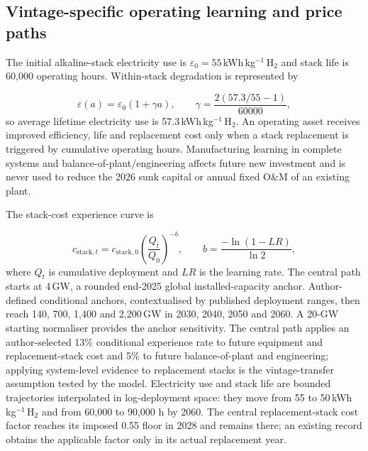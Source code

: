 \documentclass[lineno,pdflatex,sn-nature]{sn-jnl}
\begin{document}
\subsection*{Vintage-specific operating learning and price paths}

The initial alkaline-stack electricity use is $\varepsilon_0=55$\,kWh\,kg$^{-1}$\,H$_2$ and stack life is 60,000 operating hours. Within-stack degradation is represented by

\begin{equation}
\varepsilon(a)=\varepsilon_0(1+\gamma a), \qquad
\gamma=\frac{2(57.3/55-1)}{60000},
\label{eq:degradation}
\end{equation}
so average lifetime electricity use is 57.3\,kWh\,kg$^{-1}$\,H$_2$. An operating asset receives improved efficiency, life and replacement cost only when a stack replacement is triggered by cumulative operating hours. Manufacturing learning in complete systems and balance-of-plant/engineering affects future new investment and is never used to reduce the 2026 sunk capital or annual fixed O\&M of an existing plant.

The stack-cost experience curve is

\begin{equation}
c_{\mathrm{stack},t}=c_{\mathrm{stack},0}
\left(\frac{Q_t}{Q_0}\right)^{-b}, \qquad
b=\frac{-\ln(1-LR)}{\ln 2},
\label{eq:learning}
\end{equation}
where $Q_t$ is cumulative deployment and $LR$ is the learning rate. The central path starts at 4\,GW, a rounded end-2025 global installed-capacity anchor\cite{iea2025}. Author-defined conditional anchors, contextualised by published deployment ranges, then reach 140, 700, 1,400 and 2,200\,GW in 2030, 2040, 2050 and 2060. A 20-GW starting normaliser provides the anchor sensitivity. The central path applies an author-selected 13\% conditional experience rate to future equipment and replacement-stack cost and 5\% to future balance-of-plant and engineering; applying system-level evidence to replacement stacks is the vintage-transfer assumption tested by the model. Electricity use and stack life are bounded trajectories interpolated in log-deployment space: they move from 55 to 50\,kWh\,kg$^{-1}$\,H$_2$ and from 60,000 to 90,000 h by 2060\cite{glenk2023,doe2024,worldbank2026,iea2025}. The central replacement-stack cost factor reaches its imposed 0.55 floor in 2028 and remains there; an existing record obtains the applicable factor only in its actual replacement year.
\end{document}
